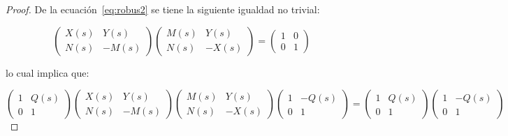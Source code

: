         \begin{proof}
            De la ecuación~\ref{eq:robus2} se tiene la siguiente igualdad no trivial:

            \begin{equation} \label{eq:robus6}
                \begin{pmatrix}
                    X(s) & Y(s) \\
                    N(s) & -M(s)
                \end{pmatrix}
                \begin{pmatrix}
                    M(s) & Y(s) \\
                    N(s) & -X(s)
                \end{pmatrix} =
                \begin{pmatrix}
                    1 & 0 \\
                    0 & 1
                \end{pmatrix}
            \end{equation}

            lo cual implica que:

            \begin{equation*}
                \begin{pmatrix}
                    1 & Q(s) \\
                    0 & 1
                \end{pmatrix}
                \begin{pmatrix}
                    X(s) & Y(s) \\
                    N(s) & -M(s)
                \end{pmatrix}
                \begin{pmatrix}
                    M(s) & Y(s) \\
                    N(s) & -X(s)
                \end{pmatrix}
                \begin{pmatrix}
                    1 & -Q(s) \\
                    0 & 1
                \end{pmatrix} =
                \begin{pmatrix}
                    1 & Q(s) \\
                    0 & 1
                \end{pmatrix}
                \begin{pmatrix}
                    1 & -Q(s) \\
                    0 & 1
                \end{pmatrix}
            \end{equation*}


\end{proof}
